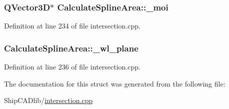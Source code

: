 \subsubsection[{\texorpdfstring{\+\_\+moi}{_moi}}]{\setlength{\rightskip}{0pt plus 5cm}Q\+Vector3D$\ast$ Calculate\+Spline\+Area\+::\+\_\+moi}\hypertarget{structCalculateSplineArea_afcd9ae27bc3f89b4fa995f7f1cfd2746}{}\label{structCalculateSplineArea_afcd9ae27bc3f89b4fa995f7f1cfd2746}


Definition at line 234 of file intersection.\+cpp.

\subsubsection[{\texorpdfstring{\+\_\+wl\+\_\+plane}{_wl_plane}}]{ Calculate\+Spline\+Area\+::\+\_\+wl\+\_\+plane}\hypertarget{structCalculateSplineArea_a0f3126c4f34b545eea5bbce5f340f21c}{}\label{structCalculateSplineArea_a0f3126c4f34b545eea5bbce5f340f21c}


Definition at line 236 of file intersection.\+cpp.



The documentation for this struct was generated from the following file\+:\begin{DoxyCompactItemize}
\item 
Ship\+C\+A\+Dlib/\hyperlink{intersection_8cpp}{intersection.\+cpp}\end{DoxyCompactItemize}
